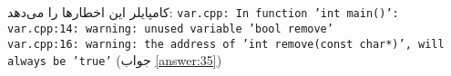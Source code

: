 \section{}
\paragraph{}\label{hint:13}
کامپایلر  این اخطارها را می‌دهد:
\LTR
\noindent\texttt{var.cpp: In function 'int main()':\\}
\texttt{var.cpp:14: warning: unused variable 'bool remove'\\}
\texttt{var.cpp:16: warning: the address of 'int remove(const char*)', will always be 'true'}
\RTL
(جواب \ref{answer:35})